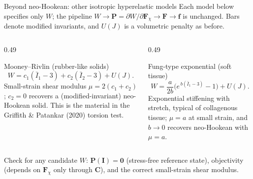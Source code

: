 \documentclass[aspectratio=169,11pt]{beamer}
\newcommand{\I}{\bm{I}}
\newcommand{\Fdef}{\bm{F}_{\chi}}
\newcommand{\Cten}{\bm{C}}
\newcommand{\Pten}{\bm{P}}
\newcommand{\FLag}{\bm{F}}
\newcommand{\fEuler}{\bm{f}}
\begin{document}
\begin{frame}{Beyond neo-Hookean: other isotropic hyperelastic models}
\small
Each model below specifies only \(W\); the pipeline \(W\to\Pten=\partial W/\partial\Fdef\to\FLag\to\fEuler\) is unchanged. Bars denote modified invariants, and \(U(J)\) is a volumetric penalty as before.
\begin{columns}[T,onlytextwidth]
\begin{column}{0.49\textwidth}
\begin{block}{Mooney--Rivlin (rubber-like solids)}
\[
  W=c_1(\bar I_1-3)+c_2(\bar I_2-3)+U(J).
\]
Small-strain shear modulus \(\mu=2(c_1+c_2)\); \(c_2=0\) recovers a (modified-invariant) neo-Hookean solid. This is the material in the Griffith \& Patankar (2020) torsion test.
\end{block}
\end{column}
\begin{column}{0.49\textwidth}
\begin{block}{Fung-type exponential (soft tissue)}
\[
  W=\frac{a}{2b}\Big(e^{\,b(\bar I_1-3)}-1\Big)+U(J).
\]
Exponential stiffening with stretch, typical of collagenous tissue; \(\mu=a\) at small strain, and \(b\to0\) recovers neo-Hookean with \(\mu=a\).
\end{block}
\end{column}
\end{columns}
\medskip
\begin{punchbox}
\small
Check for any candidate \(W\): \(\Pten(\I)=\bm{0}\) (stress-free reference state), objectivity (depends on \(\Fdef\) only through \(\Cten\)), and the correct small-strain shear modulus.
\end{punchbox}
\end{frame}
\end{document}
